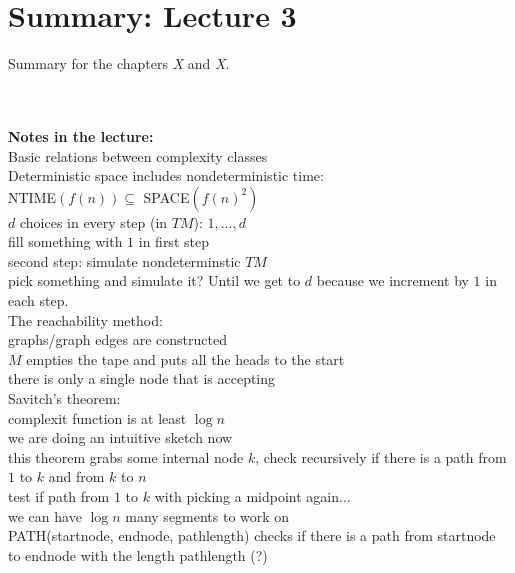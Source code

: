 \documentclass[a4]{scrartcl}
\begin{document}




\section*{Summary: Lecture 3}

Summary for the chapters \textit{X} and \textit{X}. \cite{book}





\ \\
\\
\textbf{Notes in the lecture:} \\

Basic relations between complexity classes \\

Deterministic space includes nondeterministic time: \\
NTIME$(f(n)) \subseteq$ SPACE$(f(n)^2)$ \\
$d$ choices in every step (in $TM$): $1,...,d$ \\
fill something with $1$ in first step \\
second step: simulate nondeterminstic $TM$ \\
pick something and simulate it? %
Until we get to $d$ because we increment by $1$ in each step. \\

The reachability method: \\
graphs/graph edges are constructed \\
$M$ empties the tape and puts all the heads to the start \\
there is only a single node that is accepting \\

Savitch's theorem: \\
complexit function is at least $\log n$ \\
we are doing an intuitive sketch now \\
this theorem grabs some internal node $k$, check recursively if there is a path from $1$ to $k$ and from $k$ to $n$ \\
test if path from $1$ to $k$ with picking a midpoint again... \\
we can have $\log n$ many segments to work on \\
PATH(startnode, endnode, pathlength) checks if there is a path from startnode to endnode with the length pathlength (?) \\















\newpage

\printbibliography
\end{document}
